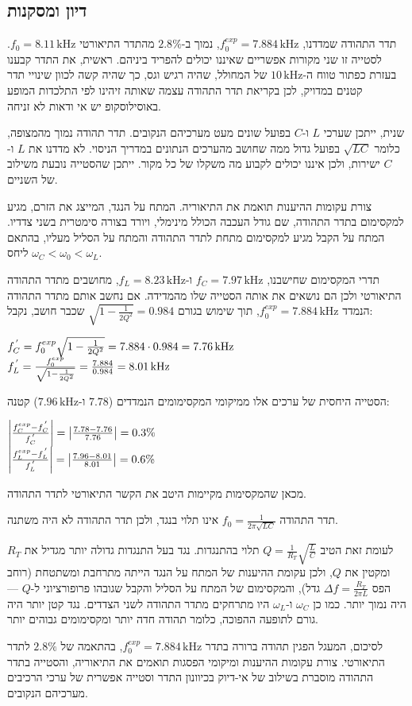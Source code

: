 \documentclass[14pt]{extarticle}
\makeatletter
\newenvironment{lefteqs}{%
    \begin{english}%
    \begin{flushleft}%
    \renewcommand{\arraystretch}{1.3}%
    $\begin{array}{@{}l@{}}%
}{%
    \end{array}$%
    \end{flushleft}%
    \end{english}%
}
\makeatother
\begin{document}
\subsection*{דיון ומסקנות}

תדר התהודה שמדדנו, $f_0^{exp} = 7.884\,\text{kHz}$, נמוך ב-$2.8\%$ מהתדר התיאורטי $f_0 = 8.11\,\text{kHz}$. לסטייה זו שני מקורות אפשריים שאיננו יכולים להפריד ביניהם. ראשית, את התדר קבענו בעזרת כפתור טווח ה-$10\,\text{kHz}$ של המחולל, שהיה רגיש וגס, כך שהיה קשה לכוון שינויי תדר קטנים במדויק, לכן בקריאת תדר התהודה עצמה שאותה זיהינו לפי התלכדות המופע באוסילוסקופ יש אי ודאות לא זניחה.

שנית, ייתכן שערכי $L$ ו-$C$ בפועל שונים מעט מערכיהם הנקובים. תדר תהודה נמוך מהמצופה, כלומר $\sqrt{LC}$ בפועל גדול ממה שחושב מהערכים הנתונים במדריך הניסוי. לא מדדנו את $L$ ו-$C$ ישירות, ולכן איננו יכולים לקבוע מה משקלו של כל מקור. ייתכן שהסטייה נובעת משילוב של השניים.

צורת עקומות ההיענות תואמת את התיאוריה. המתח על הנגד, המייצג את הזרם, מגיע למקסימום בתדר התהודה, שם גודל העכבה הכולל מינימלי, ויורד בצורה סימטרית בשני צדדיו. המתח על הקבל מגיע למקסימום מתחת לתדר התהודה והמתח על הסליל מעליו, בהתאם ליחס $\omega_C < \omega_0 < \omega_L$.

תדרי המקסימום שחישבנו, $f_C = 7.97\,\text{kHz}$ ו-$f_L = 8.23\,\text{kHz}$, מחושבים מתדר התהודה התיאורטי ולכן הם נושאים את אותה הסטייה שלו מהמדידה. אם נחשב אותם מתדר התהודה הנמדד $f_0^{exp} = 7.884\,\text{kHz}$, תוך שימוש בגורם $\sqrt{1 - \frac{1}{2Q^2}} = 0.984$ שכבר חושב, נקבל:
\begin{lefteqs}
    f_C^{\,'} = f_0^{exp}\sqrt{1 - \frac{1}{2Q^2}} = 7.884 \cdot 0.984 = 7.76\,\text{kHz} \\
    f_L^{\,'} = \frac{f_0^{exp}}{\sqrt{1 - \frac{1}{2Q^2}}} = \frac{7.884}{0.984} = 8.01\,\text{kHz}
\end{lefteqs}
הסטייה היחסית של ערכים אלו ממיקומי המקסימומים הנמדדים ($7.78$ ו-$7.96\,\text{kHz}$) קטנה:
\begin{lefteqs}
    \left|\frac{f_C^{exp} - f_C^{\,'}}{f_C^{\,'}}\right| = \left|\frac{7.78 - 7.76}{7.76}\right| = 0.3\% \\
    \left|\frac{f_L^{exp} - f_L^{\,'}}{f_L^{\,'}}\right| = \left|\frac{7.96 - 8.01}{8.01}\right| = 0.6\%
\end{lefteqs}
מכאן שהמקסימות מקיימות היטב את הקשר התיאורטי לתדר התהודה.

תדר התהודה $f_0 = \frac{1}{2\pi\sqrt{LC}}$ אינו תלוי בנגד, ולכן תדר התהודה לא היה משתנה.

לעומת זאת הטיב $Q = \frac{1}{R_T}\sqrt{\frac{L}{C}}$ תלוי בהתנגדות.
נגד בעל התנגדות גדולה יותר מגדיל את $R_T$ ומקטין את $Q$, ולכן עקומת ההיענות של המתח על הנגד הייתה מתרחבת ומשתטחת (רוחב הפס $\Delta f = \frac{R_T}{2\pi L}$ גדל), והמקסימום של המתח על הסליל והקבל שגובהו פרופורציוני ל-$Q$ — היה נמוך יותר. כמו כן $\omega_C$ ו-$\omega_L$ היו מתרחקים מתדר התהודה לשני הצדדים.
נגד קטן יותר היה גורם לתופעה ההפוכה, כלומר תהודה חדה יותר ומקסימומים גבוהים יותר.

לסיכום, המעגל הפגין תהודה ברורה בתדר $f_0^{exp} = 7.884\,\text{kHz}$, בהתאמה של $2.8\%$ לתדר התיאורטי. צורת עקומות ההיענות ומיקומי הפסגות תואמים את התיאוריה, והסטייה בתדר התהודה מוסברת בשילוב של אי-דיוק בכיוונון התדר וסטייה אפשרית של ערכי הרכיבים מערכיהם הנקובים.
\end{document}

